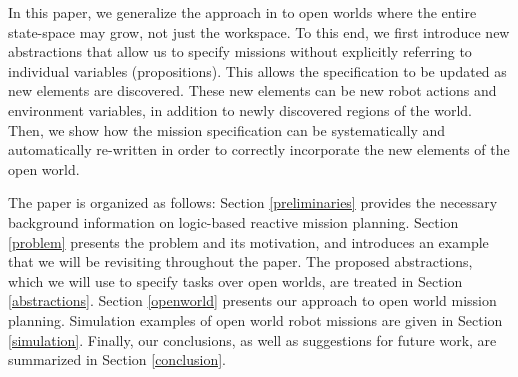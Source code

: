 In this paper, we generalize the approach in \cite{BingxinRSS2012} to open worlds where the entire state-space may grow, not just the workspace. 
To this end, we first introduce new abstractions that allow us to specify missions without explicitly referring to individual variables (propositions). This allows the specification to be updated as new elements are discovered. These new elements can be new robot actions and environment variables, in addition to newly discovered regions of the world. 
Then, we show how the mission specification can be systematically and automatically re-written in order to correctly incorporate the new elements of the open world.

The paper is organized as follows: Section \ref{preliminaries} provides the necessary background information on logic-based reactive mission planning. Section \ref{problem} presents the problem and its motivation, and introduces an example that we will be revisiting throughout the paper. The proposed abstractions, which we will use to specify tasks over open worlds, are treated in Section \ref{abstractions}. Section \ref{openworld} presents our approach to open world mission planning. Simulation examples of open world robot missions are given in Section \ref{simulation}. Finally, our conclusions, as well as suggestions for future work, are summarized in Section \ref{conclusion}.


